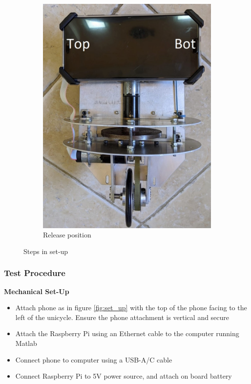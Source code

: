 \documentclass[twoside,twocolumn,12pt]{article}
\begin{document}
\begin{figure}[t]
\begin{subfigure}[t]{0.325\textwidth}
    \includegraphics[width=\linewidth]{front_lab}
    \caption{Release position}
  \label{fig:unirel}
  \end{subfigure}
  \caption{Steps in set-up}
  \label{fig:set_up_steps}
\end{figure}

\subsubsection{Test Procedure}

\textbf{Mechanical Set-Up}
\begin{itemize}
\item Attach phone as in figure \ref{fig:set_up} with the top of the phone facing to the left of the unicycle. Ensure the phone attachment is vertical and secure
\item Attach the Raspberry Pi using an Ethernet cable to the computer running Matlab
\item Connect phone to computer using a USB-A/C cable
\item Connect Raspberry Pi to 5V power source, and attach on board battery
\end{itemize}
\end{document}
